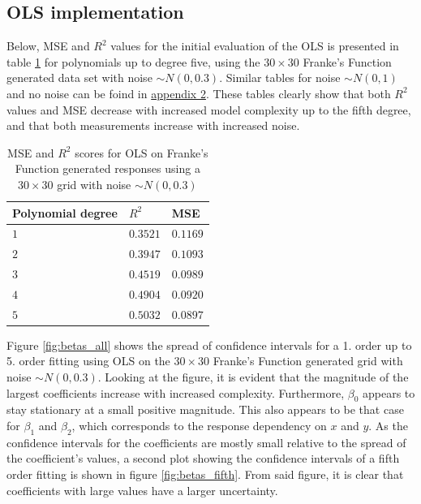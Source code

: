 \documentclass[%
oneside,                 %
final,                   %
10pt]{article}
\begin{document}
\subsection{OLS implementation}
Below, MSE and $R^2$ values for the initial evaluation of the OLS is presented in table \ref{table:OLS_mse_r2} for polynomials up to degree five, using the  $30 \times 30$ Franke's Function generated data set with noise $\sim N(0,0.3)$. Similar tables for noise $\sim N(0,1)$ and no noise can be foind in \hyperref[APP_2]{appendix 2}. These tables clearly show that both $R^2$ values and MSE decrease with increased model complexity up to the fifth degree, and that both measurements increase with increased noise.  
\begin{table}[h!]
\begin{center}
\begin{tabular}{lll}
\hline
 Polynomial degree   & $R^2$      & MSE        \\
\hline
 $ 1 $               & $ 0.3521 $ & $ 0.1169 $ \\
 $ 2 $               & $ 0.3947 $ & $ 0.1093 $ \\
 $ 3 $               & $ 0.4519 $ & $ 0.0989 $ \\
 $ 4 $               & $ 0.4904 $ & $ 0.0920 $ \\
 $ 5 $               & $ 0.5032 $ & $ 0.0897 $ \\
\hline
\end{tabular}
\end{center}
\caption{MSE and $R^2$ scores for OLS on  Franke's Function generated responses using a $30\times 30$ grid with noise $\sim N(0,0.3)$ }
\label{table:OLS_mse_r2}
\end{table}

Figure \ref{fig:betas_all} shows the spread of confidence intervals for a 1. order up to 5. order fitting using OLS on the $30 \times 30$ Franke's Function generated grid with noise $\sim N(0,0.3)$. Looking at the figure, it is evident that the magnitude of the largest coefficients increase with increased complexity. Furthermore, $\beta_0$ appears to stay stationary at a small positive magnitude. This also appears to be that case for  $\beta_1$ and $\beta_2$, which corresponds to the response dependency on $x$ and $y$. As the confidence intervals for the coefficients are mostly small relative to the spread of the coefficient's values, a second plot showing the confidence intervals of a fifth order fitting is shown in figure \ref{fig:betas_fifth}. From said figure, it is clear that coefficients with large values have a larger uncertainty. 
\end{document}
